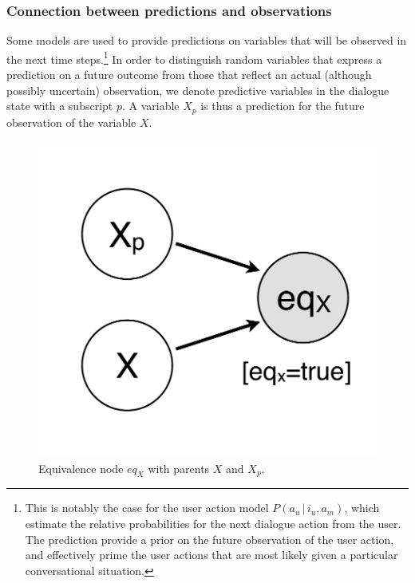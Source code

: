 \newpage
\subsubsection*{Connection between predictions and observations}


Some models are used to provide predictions on variables that will be observed in the next time steps.\footnote{This is notably the case for the user action model $P(a_u \, | \, i_u, a_m)$, which estimate the relative probabilities for the next dialogue action from the user. The prediction provide a prior on the future observation of the user action, and effectively prime the user actions that are most likely given a particular conversational situation.} In order to distinguish random variables that express a prediction on a future outcome from those that reflect an actual (although possibly uncertain) observation, we denote predictive variables in the dialogue state with a subscript $p$. A variable $X_p$ is thus a prediction for the future observation of the variable $X$. 

\begin{figure}
\vspace{-6mm}
\centering
\includegraphics[scale=0.25]{imgs/prediction.pdf} 
\caption{Equivalence node $eq_{X}$ with parents $X$ and $X_p$.}
\label{fig:prediction}
\end{figure}

